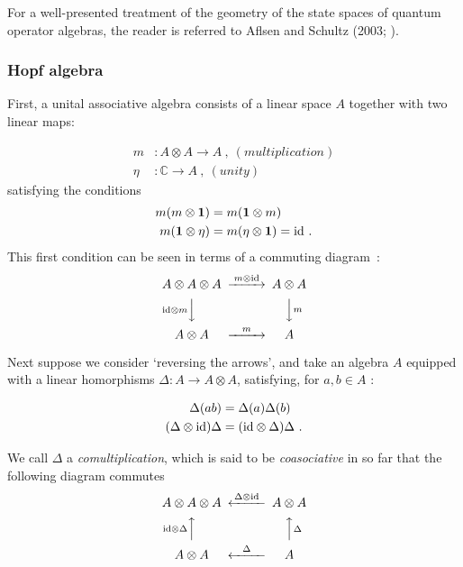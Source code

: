 \documentclass[12pt]{article}
\theoremstyle{plain}
\theoremstyle{definition}
\numberwithin{equation}{section}
\newcommand{\ID}{{\rm id}}
\newcommand{\bC}{\mathbb{C}}
\newcommand{\lra}{{\longrightarrow}}
\newcommand{\<}{{\langle}}
\begin{document}
 For a well-presented treatment of the geometry of the state spaces of quantum operator algebras, 
the reader is referred to Aflsen and Schultz (2003; \cite{AS2k3}).


\subsubsection{Hopf algebra}
 First, a unital associative algebra consists of a linear space
$A$ together with two linear maps:

\begin{equation}
\begin{aligned} m &: A \otimes A \lra A~,~(multiplication) \\
\eta &: \bC \lra A~,~ (unity)
\end{aligned}
\end{equation}
satisfying the conditions
\begin{equation}
\begin{aligned}
m(m \otimes \mathbf 1) &= m (\mathbf 1 \otimes m)  \\  m(\mathbf 1
\otimes \eta) &= m (\eta \otimes \mathbf 1) = \ID~.
\end{aligned}
\end{equation}
This first condition can be seen in terms of a commuting diagram~:
\begin{equation}
\begin{CD}
A \otimes A \otimes A @> m \otimes \ID>> A \otimes A
\\ @V \ID \otimes mVV   @VV m V
 \\ A \otimes A  @ > m >> A
\end{CD}
\end{equation}

 Next suppose we consider `reversing the arrows', and take an
algebra $A$ equipped with a linear homorphisms $\Delta : A \lra A
\otimes A$, satisfying, for $a,b \in A$ :

\begin{equation}
\begin{aligned} \Delta(ab) &= \Delta(a) \Delta(b)
\\ (\Delta \otimes \ID) \Delta &= (\ID \otimes \Delta) \Delta~.
\end{aligned}
\end{equation}

  We call $\Delta$ a \emph{comultiplication}, which is said to be
\emph{coasociative} in so far that the following diagram commutes
\begin{equation}
\begin{CD}
A \otimes A \otimes A @< \Delta\otimes \ID<< A \otimes A
\\ @A \ID \otimes \Delta AA  @AA \Delta A
 \\ A \otimes A  @ < \Delta << A
\end{CD}
\end{equation}
\end{document}
